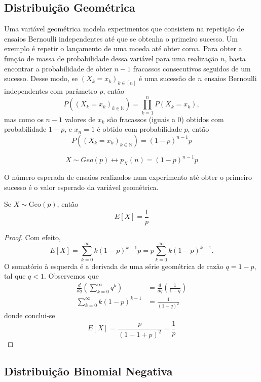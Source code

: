 \subsection{Distribuição Geométrica}

Uma variável geométrica modela experimentos que consistem na repetição de ensaios Bernoulli
independentes até que se obtenha o primeiro sucesso. Um exemplo é repetir o lançamento
de uma moeda até obter coroa. Para obter a função de massa de probabilidade dessa variável
para uma realização $n$, basta encontrar a probabilidade de obter $n-1$ fracassos
consecutivos seguidos de um sucesso. Desse modo, se $(X_k = x_k)_{k \in [n]}$ é
uma sucessão de $n$ ensaios Bernoulli independentes com parâmetro $p$, então
\[
	P((X_k = x_k)_{k \in \mathbb{N}}) = \prod_{k=1}^n P(X_k = x_k),
\]
mas como os $n-1$ valores de $x_k$ são fracassos (iguais a 0) obtidos com probabilidade
$1-p$, e $x_n = 1$ é obtido com probabilidade $p$, então
\[
	P((X_k = x_k)_{k \in \mathbb{N}}) = (1-p)^{n-1}p
\]

\begin{def:geometrica}
\[
	X \sim Geo(p) \longleftrightarrow p_X(n) = (1-p)^{n-1}p
\]
\end{def:geometrica}

O número esperada de ensaios realizados num experimento até obter o primeiro sucesso
é o valor esperado da variável geométrica.

\begin{prop:esperanca geometrica}
Se $X \sim \mathrm{Geo}(p)$, então
\[
	E[X] = \frac{1}{p}
\]
\begin{proof}
	Com efeito,
	\[
		E[X] = \sum_{k=0}^\infty k (1-p)^{k-1} p = p \sum_{k=0}^\infty k(1-p)^{k-1}.
	\]
	O somatório à esquerda é a derivada de uma série geométrica de razão $q = 1-p$,
	tal que $q < 1$. Observemos que
	\begin{align*}
		\frac{d}{dq} \left(\sum_{k=0}^\infty q^k\right) & =
		\frac{d}{dq} \left(\frac{1}{1 - q}\right)                             \\
		\sum_{k=0}^\infty k(1-p)^{k-1}                  & = \frac{1}{(1-q)^2}
	\end{align*}
	donde conclui-se
	\[
		E[X] = \frac{p}{(1 - 1 + p)^2} = \frac{1}{p}
	\]
\end{proof}
\end{prop:esperanca geometrica}

\subsection{Distribuição Binomial Negativa}

